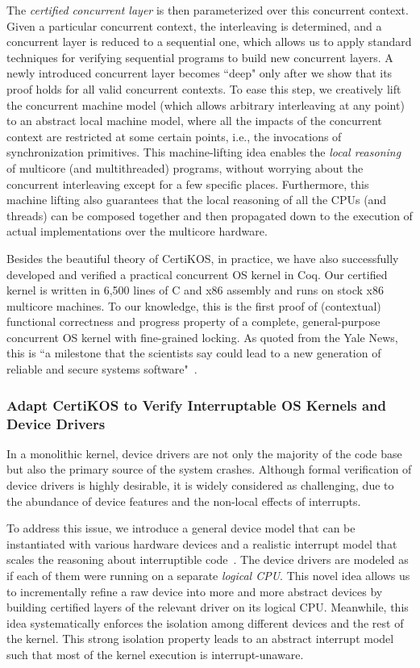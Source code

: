 \documentclass[a4paper, 10pt]{article}
\begin{document}
\begin{small}
The \emph{certified concurrent layer}  is then parameterized over this concurrent context.
Given a particular concurrent context,
the interleaving is determined,
and a concurrent layer is reduced to a sequential one, which allows us to apply standard techniques for
verifying sequential programs to build new concurrent layers.
A newly introduced concurrent layer becomes ``deep" only after we show that its proof holds for all valid concurrent contexts.
To ease this step, we creatively lift the concurrent machine model (which allows arbitrary interleaving at any point) to an abstract local machine model,
where all the impacts of the concurrent context are restricted at
some certain points, i.e.,
the invocations of synchronization primitives. This machine-lifting idea
enables the \emph{local reasoning} of multicore (and multithreaded) programs,
without worrying about the concurrent interleaving except for a few specific places. Furthermore, this machine lifting also guarantees that the local reasoning of all the
CPUs (and threads) can be composed together
and then 
propagated down to the execution of actual 
implementations over the  multicore hardware.

 
Besides the beautiful theory of CertiKOS, in practice,
we have also successfully developed and verified a practical concurrent OS
kernel in Coq. Our certified kernel is written in 6,500 lines of
C and x86 assembly and runs on stock x86 multicore
machines. To our knowledge, this is the first proof of
(contextual) functional correctness and progress
property of a complete, general-purpose
concurrent OS kernel with fine-grained locking.
As quoted from the Yale News, this is ``a milestone that the scientists say could lead to a new generation of reliable and secure systems software"~\cite{news}.

\subsubsection*{\small Adapt CertiKOS to Verify Interruptable OS Kernels and Device Drivers}
In a monolithic kernel,
device drivers are not only the majority of the code base
but also the primary source of the system crashes.
Although formal verification of device drivers is highly desirable, it is widely considered as challenging, due to the abundance of device features
and the non-local effects of interrupts.

To address this issue, we introduce
a general device model that can be
instantiated with various hardware devices and a realistic
interrupt model that scales the reasoning
about interruptible code~\cite{pldi16-device}. 
The device drivers are modeled
as if each of them were running on a  separate \emph{logical CPU}. This novel idea allows us to
incrementally refine a raw
device into more and more abstract devices
by building certified layers of the relevant driver on its logical CPU.
Meanwhile, this idea systematically enforces
the isolation among different devices and the
rest of the kernel. This strong isolation property 
leads to an abstract interrupt model such that
most of the kernel execution is interrupt-unaware.


\end{small}
\end{document}
